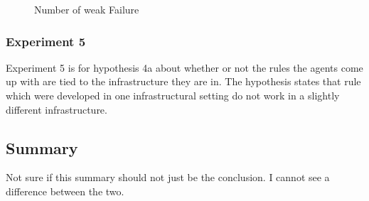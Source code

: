 \documentclass[a4paper]{article}
\begin{document}
\begin{figure}[!ht]
\caption{Number of weak Failure}
\label{d_weak}
\end{figure}

\subsubsection{Experiment 5}
Experiment 5 is for hypothesis 4a about whether or not the rules the agents come up with are tied to the infrastructure they are in. 
The hypothesis states that rule which were developed in one infrastructural setting do not work in a slightly different infrastructure. 
\subsection{Summary}
Not sure if this summary should not just be the conclusion. I cannot see a difference between the two. 
\end{document}
